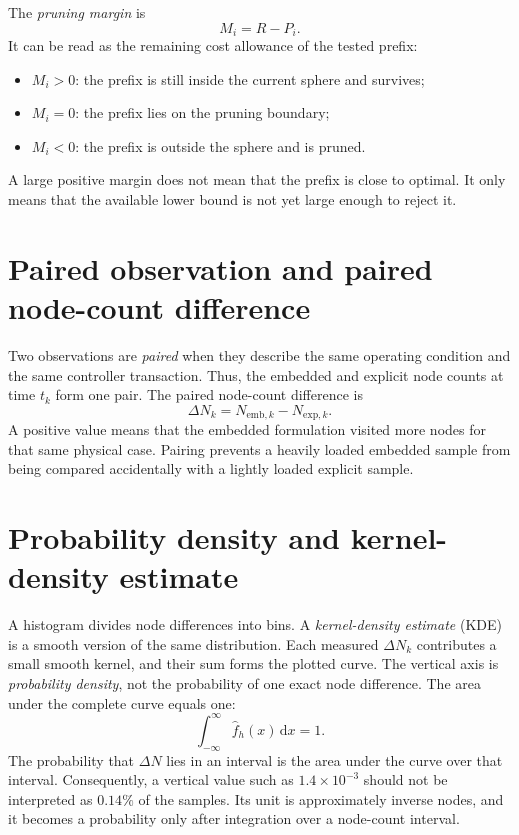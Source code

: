 \documentclass[paper=a4,oneside,fontsize=12pt,DIV=14,headings=normal,parskip=half,headsepline,numbers=noendperiod]{scrreprt}
\begin{document}
The \emph{pruning margin} is
\begin{equation}
 M_i=R-P_i.
\end{equation}
It can be read as the remaining cost allowance of the tested prefix:
\begin{itemize}
 \item $M_i>0$: the prefix is still inside the current sphere and survives;
 \item $M_i=0$: the prefix lies on the pruning boundary;
 \item $M_i<0$: the prefix is outside the sphere and is pruned.
\end{itemize}
A large positive margin does not mean that the prefix is close to optimal.  It
only means that the available lower bound is not yet large enough to reject it.

\section{Paired observation and paired node-count difference}
Two observations are \emph{paired} when they describe the same operating
condition and the same controller transaction.  Thus, the embedded and
explicit node counts at time $t_k$ form one pair.  The paired node-count
difference is
\begin{equation}
 \Delta N_k=N_{\mathrm{emb},k}-N_{\mathrm{exp},k}.
\end{equation}
A positive value means that the embedded formulation visited more nodes for
that same physical case.  Pairing prevents a heavily loaded embedded sample
from being compared accidentally with a lightly loaded explicit sample.

\section{Probability density and kernel-density estimate}
A histogram divides node differences into bins.  A \emph{kernel-density
estimate} (KDE) is a smooth version of the same distribution.  Each measured
$\Delta N_k$ contributes a small smooth kernel, and their sum forms the plotted
curve.  The vertical axis is \emph{probability density}, not the probability of
one exact node difference.  The area under the complete curve equals one:
\begin{equation}
 \int_{-\infty}^{\infty}\widehat f_h(x)\,\mathrm dx=1.
\end{equation}
The probability that $\Delta N$ lies in an interval is the area under the curve
over that interval.  Consequently, a vertical value such as
$1.4\times10^{-3}$ should not be interpreted as $0.14\%$ of the samples.  Its
unit is approximately inverse nodes, and it becomes a probability only after
integration over a node-count interval.
\end{document}
